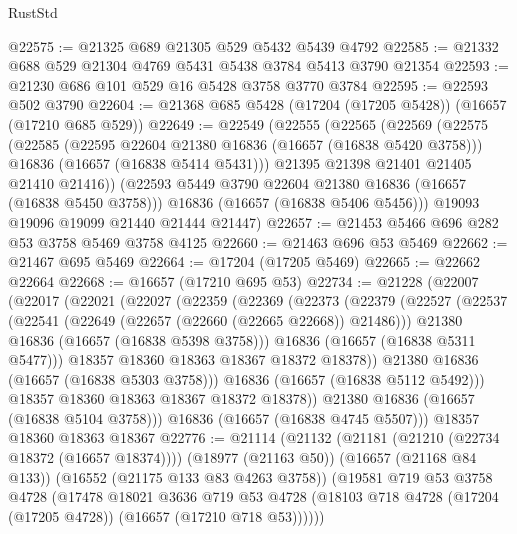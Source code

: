 \begin{lexlean}{RustStd}
\begin{coremodule}
@22575 := @21325 @689 @21305 @529 @5432 @5439 @4792
@22585 := @21332 @688 @529 @21304 @4769 @5431 @5438 @3784 @5413 @3790 @21354
@22593 := @21230 @686 @101 @529 @16 @5428 @3758 @3770 @3784
@22595 := @22593 @502 @3790
@22604 := @21368 @685 @5428 (@17204 (@17205 @5428)) (@16657 (@17210 @685 @529))
@22649 := @22549
    (@22555
      (@22565
        (@22569
          (@22575
            (@22585
              (@22595 @22604 @21380 @16836 (@16657 (@16838 @5420 @3758)))
              @16836
              (@16657 (@16838 @5414 @5431)))
            @21395
            @21398
            @21401
            @21405
            @21410
            @21416))
        (@22593 @5449 @3790 @22604 @21380 @16836 (@16657 (@16838 @5450 @3758)))
        @16836
        (@16657 (@16838 @5406 @5456)))
      @19093
      @19096
      @19099
      @21440
      @21444
      @21447)
@22657 := @21453 @5466 @696 @282 @53 @3758 @5469 @3758 @4125
@22660 := @21463 @696 @53 @5469
@22662 := @21467 @695 @5469
@22664 := @17204 (@17205 @5469)
@22665 := @22662 @22664
@22668 := @16657 (@17210 @695 @53)
@22734 := @21228
    (@22007
      (@22017
        (@22021
          (@22027
            (@22359
              (@22369
                (@22373
                  (@22379
                    (@22527
                      (@22537
                        (@22541 (@22649 (@22657 (@22660 (@22665 @22668)) @21486)))
                        @21380
                        @16836
                        (@16657 (@16838 @5398 @3758)))
                      @16836
                      (@16657 (@16838 @5311 @5477)))
                    @18357
                    @18360
                    @18363
                    @18367
                    @18372
                    @18378))
                @21380
                @16836
                (@16657 (@16838 @5303 @3758)))
              @16836
              (@16657 (@16838 @5112 @5492)))
            @18357
            @18360
            @18363
            @18367
            @18372
            @18378))
        @21380
        @16836
        (@16657 (@16838 @5104 @3758)))
      @16836
      (@16657 (@16838 @4745 @5507)))
    @18357
    @18360
    @18363
    @18367
@22776 := @21114
    (@21132
      (@21181 (@21210 (@22734 @18372 (@16657 @18374))))
      (@18977 (@21163 @50))
      (@16657 (@21168 @84 @133))
      (@16552 (@21175 @133 @83 @4263 @3758))
      (@19581
        @719
        @53
        @3758
        @4728
        (@17478
          @18021
          @3636
          @719
          @53
          @4728
          (@18103 @718 @4728 (@17204 (@17205 @4728)) (@16657 (@17210 @718 @53))))))

\end{coremodule}
\end{lexlean}
